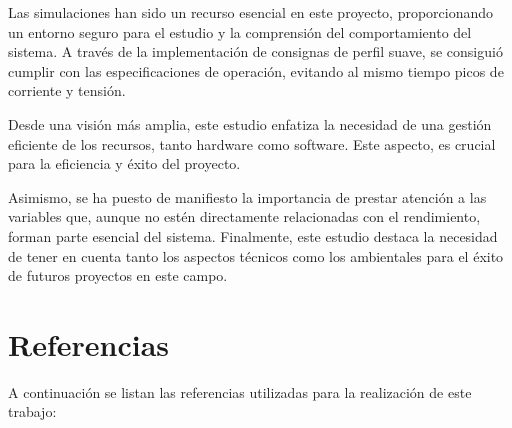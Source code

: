 \documentclass{article}
\begin{document}
Las simulaciones han sido un recurso esencial en este proyecto, proporcionando un entorno seguro para el
estudio y la comprensión del comportamiento del sistema. A través de la implementación de consignas de 
perfil suave, se consiguió cumplir con las especificaciones de operación, evitando al mismo tiempo 
picos de corriente y tensión.

Desde una visión más amplia, este estudio enfatiza la necesidad de una gestión eficiente de los 
recursos, tanto hardware como software. Este aspecto, es crucial para la eficiencia y éxito del 
proyecto.

Asimismo, se ha puesto de manifiesto la importancia de prestar atención a las variables que, aunque 
no estén directamente relacionadas con el rendimiento, forman parte esencial del sistema. Finalmente, 
este estudio destaca la necesidad de tener en cuenta tanto los aspectos técnicos como los ambientales 
para el éxito de futuros proyectos en este campo.

\newpage

\part*{Referencias}

A continuación se listan las referencias utilizadas para la realización de este trabajo:


\label{LastPage}    
\end{document}
